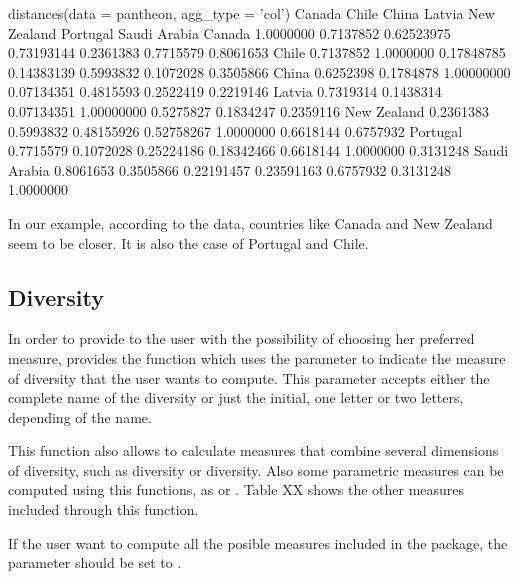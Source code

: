 \begin{example}
  distances(data = pantheon, agg_type = 'col')
                Canada     Chile      China     Latvia New Zealand  Portugal Saudi Arabia
Canada       1.0000000 0.7137852 0.62523975 0.73193144   0.2361383 0.7715579    0.8061653
Chile        0.7137852 1.0000000 0.17848785 0.14383139   0.5993832 0.1072028    0.3505866
China        0.6252398 0.1784878 1.00000000 0.07134351   0.4815593 0.2522419    0.2219146
Latvia       0.7319314 0.1438314 0.07134351 1.00000000   0.5275827 0.1834247    0.2359116
New Zealand  0.2361383 0.5993832 0.48155926 0.52758267   1.0000000 0.6618144    0.6757932
Portugal     0.7715579 0.1072028 0.25224186 0.18342466   0.6618144 1.0000000    0.3131248
Saudi Arabia 0.8061653 0.3505866 0.22191457 0.23591163   0.6757932 0.3131248    1.0000000
\end{example}

In our example, according to the data, countries like Canada and New Zealand seem to be closer. It is also the case of  Portugal and Chile.

\subsection{Diversity}\label{sec:diversity}
In order to provide to the user with the possibility of choosing her preferred measure,  provides the function  which uses the parameter  to indicate the measure of diversity that the user wants to compute. This parameter accepts either the complete name of the diversity or just the initial, one letter or two letters, depending of the name. 

This function also allows to calculate measures that combine several dimensions of diversity, such as  diversity or  diversity. Also some parametric measures can be computed using this functions, as  or . Table XX shows the other measures included through this function.

If the user want to compute all the posible measures included in the package, the parameter  should be set to .

